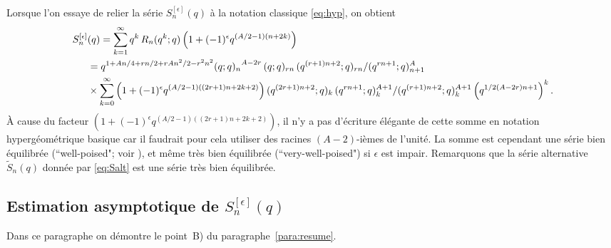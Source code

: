\documentclass[12pt]{amsart}
\newcommand{\ep}{\epsilon}
\theoremstyle{remark}
\numberwithin{equation}{section}
\begin{document}
Lorsque l'on essaye de relier la s{\'e}rie $S^{[\ep]}_n(q)$ {\`a} la notation
classique \eqref{eq:hyp}, on obtient
\begin{align}
\label{eq:Sexplicit}
S^{[\ep]}_n&(q)=
\sum _{k=1}
^{\infty}q^k\,R_n(q^k;q)\left(1+(-1)^\ep q^{(A/2-1)(n+2k)}\right)\\
\notag
&=q^{1 + \frac{A n}{4} + \frac{rn }{2} + \frac{rA n^2 }{2} -
        r^2 n^2 }
  \frac{
     {({\let \over / \def\frac#1#2{#1 / #2} q}; q) _{n} }^{A - 2 r}\,
     ({\let \over / \def\frac#1#2{#1 / #2} q}; q) _{r n} \,
     ({\let \over / \def\frac#1#2{#1 / #2} q^ {(r+1)n+2}}; q)
      _{r n}  }{{(\let \over /
       \def\frac#1#2{#1 / #2} q^ { rn+1}}; q) _{n+1} ^A}\\
\notag
&\times
\sum _{k=0} ^{\infty}\left(1+(-1)^\ep q^{(A/2-1)((2r+1)n+2k+2)}\right)
\frac {(q^ { (2r+1)n+2};q)_k\,(q^ { r
n+1};q)_k^{A+1}} {(q^ {(r+1)n+2};q)_k^{A+1}}
\left(q^ { \frac{1}{2}(A - 2 r)n+1}\right)^k.
\end{align}
{\`A} cause du facteur $(1+(-1)^\ep q^{(A/2-1)((2r+1)n+2k+2)})$, il n'y 
a pas d'{\'e}criture {\'e}l{\'e}gante de cette somme en notation
hyperg{\'e}om{\'e}trique basique car il faudrait pour cela utiliser des 
racines $(A-2)$-i{\`e}mes de l'unit{\'e}. 
La somme est cependant une s{\'e}rie
bien {\'e}quilibr{\'e}e (``well-poised"; voir \cite[Sec.~2.1]{gr}),
et m{\^e}me tr{\`e}s bien {\'e}quilibr{\'e}e (``very-well-poised") 
si $\ep$ est impair.
Remarquons que la s{\'e}rie alternative $\tilde S_n(q)$ donn{\'e}e par 
\eqref{eq:Salt} est une s{\'e}rie tr{\`e}s bien {\'e}quilibr{\'e}e. 

\medskip

\subsection{Estimation asymptotique de $S_{n}^{[\ep]}(q)$}
Dans ce paragraphe on d{\'e}montre le point~B) du
paragraphe~\ref{para:resume}.
\end{document}
